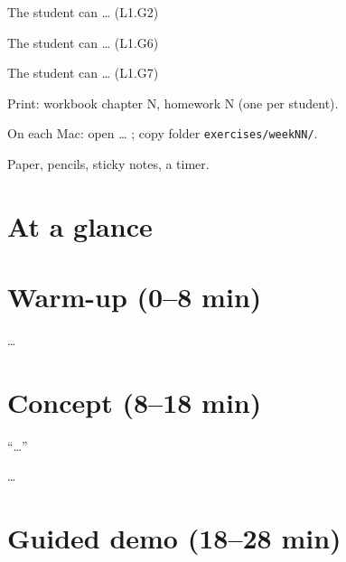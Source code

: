 
\begin{objectives}
  \item The student can … (L1.G2)
  \item The student can … (L1.G6)
  \item The student can … (L1.G7)
\end{objectives}

\begin{materials}
  \item Print: workbook chapter N, homework N (one per student).
  \item On each Mac: open … ; copy folder \texttt{exercises/weekNN/}.
  \item Paper, pencils, sticky notes, a timer.
\end{materials}

\section{At a glance}
\begin{timeplan}
\end{timeplan}

\section{Warm-up (0--8 min)}
\begin{unplugged}[Name]
…
\end{unplugged}

\section{Concept (8--18 min)}
\begin{teacherscript}
“…”
\end{teacherscript}
\begin{analogy}[…]
…
\end{analogy}

\section{Guided demo (18--28 min)}
\begin{workedexample}[…]
\end{workedexample}

